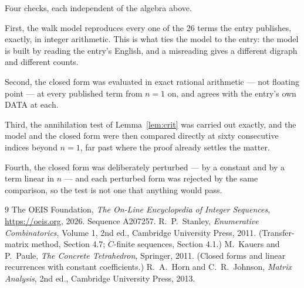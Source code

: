\documentclass[11pt,a4paper]{article}
\theoremstyle{plain}
\theoremstyle{definition}
\begin{document}
Four checks, each independent of the algebra above.

First, the walk model reproduces every one of the $26$ terms the entry publishes,
exactly, in integer arithmetic. This is what ties the model to the entry: the model is built
by reading the entry's English, and a misreading gives a different digraph and different
counts.

Second, the closed form was evaluated in exact rational arithmetic --- not floating point ---
at every published term from $n=1$ on, and agrees with the entry's own DATA at each.

Third, the annihilation test of Lemma~\ref{lem:crit} was carried out exactly, and the model
and the closed form were then compared directly at sixty consecutive indices beyond
$n=1$, far past where the proof already settles the matter.

Fourth, the closed form was deliberately perturbed --- by a constant and by a term linear in
$n$ --- and each perturbed form was rejected by the same comparison, so the test is not one
that anything would pass.

\begin{thebibliography}{9}
 The OEIS Foundation, \emph{The On-Line Encyclopedia of Integer
Sequences}, \url{https://oeis.org}, 2026. Sequence A207257.
 R.~P.~Stanley, \emph{Enumerative Combinatorics}, Volume 1, 2nd ed.,
Cambridge University Press, 2011. (Transfer-matrix method, Section 4.7; $C$-finite sequences,
Section 4.1.)
 M.~Kauers and P.~Paule, \emph{The Concrete Tetrahedron}, Springer, 2011.
(Closed forms and linear recurrences with constant coefficients.)
 R.~A.~Horn and C.~R.~Johnson, \emph{Matrix Analysis}, 2nd ed., Cambridge
University Press, 2013.
\end{thebibliography}
\end{document}
